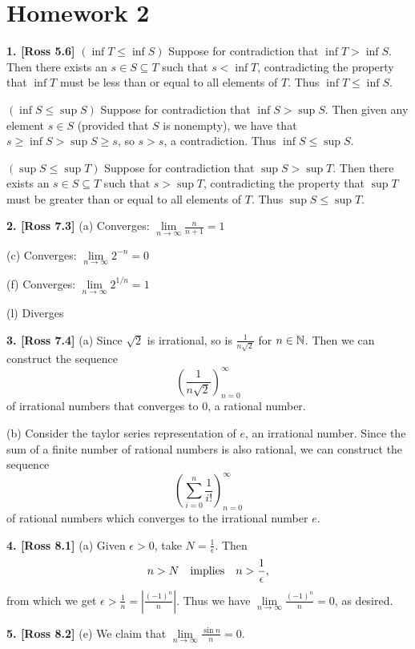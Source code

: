 \section{Homework 2}

\textbf{1. [Ross 5.6]} $(\inf T \leq \inf S)$ Suppose for contradiction that $\inf T > \inf S$. Then there exists an $s \in S \subseteq T$ such that $s < \inf T$, contradicting the property that $\inf T$ must be less than or equal to all elements of $T$. Thus $\inf T \leq \inf S$.

$(\inf S \leq \sup S)$ Suppose for contradiction that $\inf S > \sup S$. Then given any element $s \in S$ (provided that $S$ is nonempty), we have that $s \geq \inf S > \sup S \geq s$, so $s > s$, a contradiction. Thus $\inf S \leq \sup S$.

$(\sup S \leq \sup T)$ Suppose for contradiction that $\sup S > \sup T$. Then there exists an $s \in S \subseteq T$ such that $s > \sup T$, contradicting the property that $\sup T$ must be greater than or equal to all elements of $T$. Thus $\sup S \leq \sup T$.

\textbf{2. [Ross 7.3]} (a) Converges: $\lim\limits_{n \to \infty}\frac{n}{n + 1} = 1$

(c) Converges: $\lim\limits_{n \to \infty}2^{-n} = 0$

(f) Converges: $\lim\limits_{n \to \infty}2^{1/n} = 1$

(l) Diverges

\textbf{3. [Ross 7.4]} (a) Since $\sqrt{2}$ is irrational, so is $\frac{1}{n\sqrt{2}}$ for $n \in \mathbb{N}$. Then we can construct the sequence
\[
\left(\frac{1}{n\sqrt{2}}\right)_{n = 0}^\infty
\]
of irrational numbers that converges to 0, a rational number.

(b) Consider the taylor series representation of $e$, an irrational number. Since the sum of a finite number of rational numbers is also rational, we can construct the sequence 
\[
\left(\sum\limits_{i = 0}^n\frac{1}{i!}\right)_{n = 0}^\infty
\]
of rational numbers which converges to the irrational number $e$.

\textbf{4. [Ross 8.1]} (a) Given $\epsilon > 0$, take $N = \frac{1}{\epsilon}$. Then 
\[
n > N \quad\text{implies}\quad n > \frac{1}{\epsilon},
\]
from which we get $\epsilon > \frac{1}{n} = \left|\frac{(-1)^n}{n}\right|$. Thus we have $\lim\limits_{n \to \infty}\frac{(-1)^n}{n} = 0$, as desired.

\textbf{5. [Ross 8.2]} (e) We claim that $\lim\limits_{n \to \infty}\frac{\sin n}{n} = 0$.

